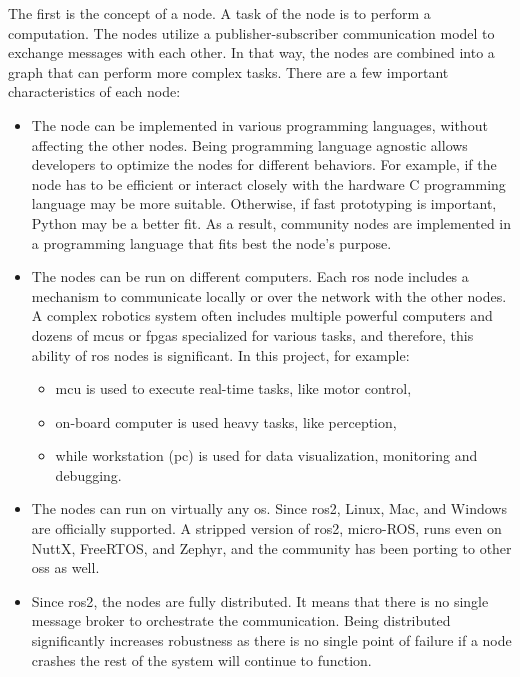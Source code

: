 The first is the concept of a node.
A task of the node is to perform a computation.
The nodes utilize a publisher-subscriber communication model to exchange messages with each other. 
In that way, the nodes are combined into a graph that can perform more complex tasks.
There are a few important characteristics of each node:
\begin{itemize}
    \item The node can be implemented in various programming languages, without affecting the other nodes.
    Being programming language agnostic allows developers to optimize the nodes for different behaviors.
    For example, if the node has to be efficient or interact closely with the hardware C programming language may be more suitable.
    Otherwise, if fast prototyping is important,  Python may be a better fit.
    As a result, community nodes are implemented in a programming language that fits best the node's purpose.
    \item The nodes can be run on different computers.
    Each \ac{ros} node includes a mechanism to communicate locally or over the network with the other nodes.
    A complex robotics system often includes multiple powerful computers and dozens of \acp{mcu} or \acp{fpga} specialized for various tasks, and therefore, this ability of \ac{ros} nodes is significant.
    In this project, for example:
    \begin{itemize}
        \item \ac{mcu} is used to execute real-time tasks, like motor control,
        \item on-board computer is used heavy tasks, like perception,
        \item while workstation (\acs{pc}) is used for data visualization, monitoring and debugging.
    \end{itemize}
    \item The nodes can run on virtually any \ac{os}.
    Since \ac{ros2}, Linux, Mac, and Windows are officially supported.
    A stripped version of \ac{ros2}, micro-ROS, runs even on NuttX, FreeRTOS, and Zephyr, and the community has been porting to other \acp{os} as well.
    \item Since \ac{ros2}, the nodes are fully distributed. 
    It means that there is no single message broker to orchestrate the communication.
    Being distributed significantly increases robustness as there is no single point of failure if a node crashes the rest of the system will continue to function.
\end{itemize}

